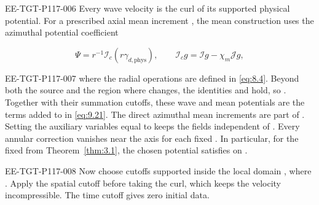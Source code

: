 \begin{EESegment}{EE-TGT-P117-006}
Every wave velocity is the curl of its supported physical potential. For a prescribed axial mean
increment , the mean construction uses the
azimuthal potential coefficient
\end{EESegment}
\[
\Psi=r^{-1}\mathcal I_c(r\gamma_{d,\mathrm{phys}}),
\qquad \mathcal I_cg=\mathcal Ig-\chi_m\mathcal Jg,
\]
\begin{EESegment}{EE-TGT-P117-007}
where the radial operations are defined in \eqref{eq:8.4}. Beyond both the source and the region
where  changes, the identities
 and  hold, so
. Together with their summation cutoffs, these wave and mean
potentials are the terms added to  in
\eqref{eq:9.21}. The direct azimuthal mean increments are part of
. Setting the auxiliary variables equal to
 keeps the fields independent of
. Every annular correction vanishes near the axis for each fixed
. In particular, for the fixed
 from Theorem~\ref{thm:3.1}, the chosen potential satisfies
 on .
\end{EESegment}

\begin{EESegment}{EE-TGT-P117-008}
Now choose cutoffs supported inside the local domain
, where
. Apply the spatial cutoff before taking the curl, which keeps the
velocity incompressible. The time cutoff gives zero initial data.
\end{EESegment}

